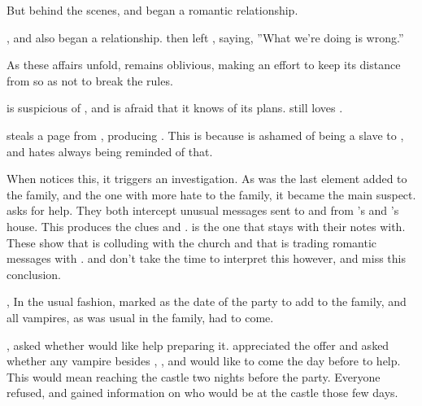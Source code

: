 
But behind the scenes,  and  began a romantic relationship.

,  and  also began a relationship.  then left , saying, ''What we're doing is wrong.''

As these affairs unfold,  remains oblivious, making an effort to keep its distance from  so as not to break the rules.

 is suspicious of , and is afraid that it knows of its plans.  still loves .

 steals a page from , producing . This is because  is ashamed of being a slave to , and hates always being reminded of that.

When  notices this, it triggers an investigation. As  was the last element added to the family, and the one with more hate to the family, it became the main suspect.  asks  for help. They both intercept unusual messages sent to and from 's and 's house. This produces the clues  and .  is the one that stays with their notes with. These show that  is colluding with the church and that  is trading romantic messages with .  and  don't take the time to interpret this however, and miss this conclusion.

, In the usual fashion, marked  as the date of the party to add  to the family, and all vampires, as was usual in the family, had to come.

,  asked whether  would like help preparing it.  appreciated the offer and asked whether any vampire besides , , and  would like to come the day before to help. This would mean reaching the castle two nights before the party. Everyone refused, and gained information on who would be at the castle those few days.

